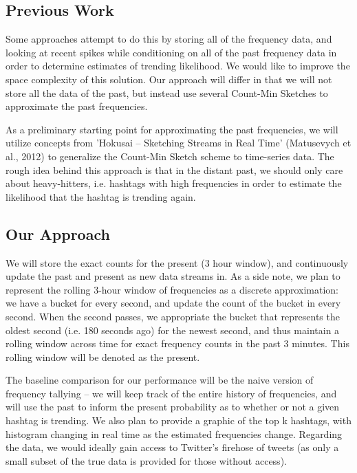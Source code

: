 \documentclass[twoside]{article}
\begin{document}
\begin{multicols}{2}
\subsection{Previous Work}


Some approaches attempt to do this by storing all of the frequency data, and looking at recent spikes while conditioning on all of the past frequency data in order to determine estimates of trending likelihood. We would like to improve the space complexity of this solution. Our approach will differ in that we will not store all the data of the past, but instead use several Count-Min Sketches to approximate the past frequencies. 

As a preliminary starting point for approximating the past frequencies, we will utilize concepts from 'Hokusai -- Sketching Streams in Real Time' (Matusevych et al., 2012) to generalize the Count-Min Sketch scheme to time-series data. The rough idea behind this approach is that in the distant past, we should only care about heavy-hitters, i.e. hashtags with high frequencies in order to estimate the likelihood that the hashtag is trending again.

\subsection{Our Approach}


We will store the exact counts for the present (3 hour window), and continuously update the past and present as new data streams in. As a side note, we plan to represent the rolling 3-hour window of frequencies as a discrete approximation: we have a bucket for every second, and update the count of the bucket in every second. When the second passes, we appropriate the bucket that represents the oldest second (i.e. 180 seconds ago) for the newest second, and thus maintain a rolling window across time for exact frequency counts in the past 3 minutes. This rolling window will be denoted as the present.

The baseline comparison for our performance will be the naive version of frequency tallying -- we will keep track of the entire history of frequencies, and will use the past to inform the present probability as to whether or not a given hashtag is trending. We also plan to provide a graphic of the top k hashtags, with histogram changing in real time as the estimated frequencies change. Regarding the data, we would ideally gain access to Twitter's firehose of tweets (as only a small subset of the true data is provided for those without access). 


\end{multicols}
\end{document}
